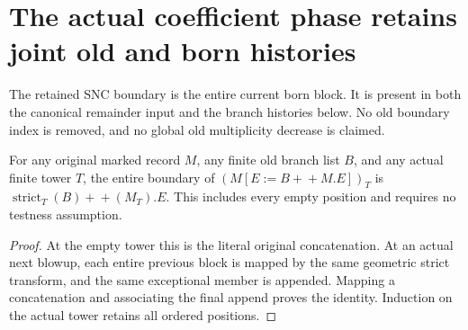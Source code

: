\section{The actual coefficient phase retains joint old and born histories}
\label{sec:boundary-coefficient-branch-histories}

The retained SNC boundary is the entire current born block. It is present in
both the canonical remainder input and the branch histories below. No old
boundary index is removed, and no global old multiplicity decrease is claimed.

\begin{lemma}
\label{hir:nc-entire-old-retained-born-boundary}
\leanok
For any original marked record $M$, any finite old branch list $B$, and any
actual finite tower $T$, the entire boundary of $(M[E:=B+\!+M.E])_T$ is
$\operatorname{strict}_T(B)+\!+(M_T).E$. This includes every empty position
and requires no testness assumption.
\end{lemma}
\begin{proof}
At the empty tower this is the literal original concatenation. At an actual
next blowup, each entire previous block is mapped by the same geometric
strict transform, and the same exceptional member is appended. Mapping a
concatenation and associating the final append proves the identity. Induction
on the actual tower retains all ordered positions.
\end{proof}


